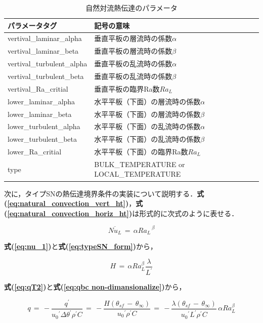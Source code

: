 \begin{table}[htdp]
\caption{自然対流熱伝達のパラメータ}
\begin{center}
\small
\begin{tabular}{ll}\toprule
パラメータタグ & 記号の意味\\ \midrule
vertival\_laminar\_alpha & 垂直平板の層流時の係数$\alpha$\\
vertival\_laminar\_beta & 垂直平板の層流時の係数$\beta$\\
vertival\_turbulent\_alpha & 垂直平板の乱流時の係数$\alpha$\\
vertival\_turbulent\_beta & 垂直平板の乱流時の係数$\beta$\\
vertival\_Ra\_critial & 垂直平板の臨界Ra数$Ra_L$\\
lower\_laminar\_alpha & 水平平板（下面）の層流時の係数$\alpha$\\
lower\_laminar\_beta & 水平平板（下面）の層流時の係数$\beta$\\
lower\_turbulent\_alpha & 水平平板（下面）の乱流時の係数$\alpha$\\
lower\_turbulent\_beta & 水平平板（下面）の乱流時の係数$\beta$\\
lower\_Ra\_critial & 水平平板（下面）の臨界Ra数$Ra_L$\\ 
type & BULK\_TEMPERATURE or LOCAL\_TEMPERATURE\\ \bottomrule
\end{tabular}
\end{center}
\label{tbl:heat transfer type SN para}
\end{table}

次に，タイプSNの熱伝達境界条件の実装について説明する．\textbf{式(\ref{eq:natural_convection_vert_ht})}，\textbf{式(\ref{eq:natural_convection_horiz_ht})}は形式的に次式のように表せる．

\begin{equation}
\overline{Nu_L} \,=\, \alpha {Ra_L}^{\,\beta}
\label{eq:typeSN_form}
\end{equation}

\noindent \textbf{式(\ref{eq:nu_1})}と\textbf{式(\ref{eq:typeSN_form})}から，

\begin{equation}
H \,=\, \alpha Ra_L^\beta \frac{\lambda}{L^\prime}
\label{eq:typeSN_form_ht}
\end{equation}

\noindent \textbf{式(\ref{eq:qT2})}と\textbf{式(\ref{eq:qbc non-dimansionalize})}から，

\begin{equation}
q \,=\, - \frac{q^\prime}{{u_\mathit{0}}^\prime \Delta \theta^\prime \rho^\prime C}
\,=\, - \frac{H (\theta_{sf}\,-\,\theta_\infty)}{{u_\mathit{0}}^\prime \rho^\prime C}
\,=\, - \frac{\lambda (\theta_{sf}\,-\,\theta_\infty)}{{u_\mathit{0}}^\prime L^\prime \rho^\prime C} \, \alpha Ra_L^\beta
\label{eq:typeSN_heat_flux}
\end{equation}

